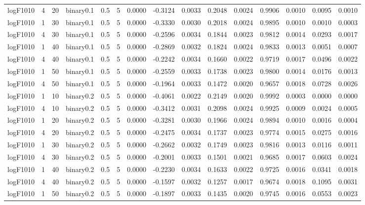 \begin{longtable}{rrrrrrrrrrrrrrr}
  logF1010 & 4 & 20 & binary0.1 & 0.5 & 5 & 0.0000 & -0.3124 & 0.0033 & 0.2048 & 0.0024 & 0.9906 & 0.0010 & 0.0095 & 0.0010 \\ 
  logF1010 & 1 & 30 & binary0.1 & 0.5 & 5 & 0.0000 & -0.3330 & 0.0030 & 0.2018 & 0.0024 & 0.9895 & 0.0010 & 0.0010 & 0.0003 \\ 
  logF1010 & 4 & 30 & binary0.1 & 0.5 & 5 & 0.0000 & -0.2596 & 0.0034 & 0.1844 & 0.0023 & 0.9812 & 0.0014 & 0.0293 & 0.0017 \\ 
  logF1010 & 1 & 40 & binary0.1 & 0.5 & 5 & 0.0000 & -0.2869 & 0.0032 & 0.1824 & 0.0024 & 0.9833 & 0.0013 & 0.0051 & 0.0007 \\ 
  logF1010 & 4 & 40 & binary0.1 & 0.5 & 5 & 0.0000 & -0.2242 & 0.0034 & 0.1660 & 0.0022 & 0.9719 & 0.0017 & 0.0496 & 0.0022 \\ 
  logF1010 & 1 & 50 & binary0.1 & 0.5 & 5 & 0.0000 & -0.2559 & 0.0033 & 0.1738 & 0.0023 & 0.9800 & 0.0014 & 0.0176 & 0.0013 \\ 
  logF1010 & 4 & 50 & binary0.1 & 0.5 & 5 & 0.0000 & -0.1964 & 0.0033 & 0.1472 & 0.0020 & 0.9657 & 0.0018 & 0.0728 & 0.0026 \\ 
  logF1010 & 1 & 10 & binary0.2 & 0.5 & 5 & 0.0000 & -0.4061 & 0.0022 & 0.2149 & 0.0020 & 0.9992 & 0.0003 & 0.0000 & 0.0000 \\ 
  logF1010 & 4 & 10 & binary0.2 & 0.5 & 5 & 0.0000 & -0.3412 & 0.0031 & 0.2098 & 0.0024 & 0.9925 & 0.0009 & 0.0024 & 0.0005 \\ 
  logF1010 & 1 & 20 & binary0.2 & 0.5 & 5 & 0.0000 & -0.3281 & 0.0030 & 0.1966 & 0.0024 & 0.9894 & 0.0010 & 0.0016 & 0.0004 \\ 
  logF1010 & 4 & 20 & binary0.2 & 0.5 & 5 & 0.0000 & -0.2475 & 0.0034 & 0.1737 & 0.0023 & 0.9774 & 0.0015 & 0.0275 & 0.0016 \\ 
  logF1010 & 1 & 30 & binary0.2 & 0.5 & 5 & 0.0000 & -0.2662 & 0.0032 & 0.1749 & 0.0023 & 0.9816 & 0.0013 & 0.0116 & 0.0011 \\ 
  logF1010 & 4 & 30 & binary0.2 & 0.5 & 5 & 0.0000 & -0.2001 & 0.0033 & 0.1501 & 0.0021 & 0.9685 & 0.0017 & 0.0603 & 0.0024 \\ 
  logF1010 & 1 & 40 & binary0.2 & 0.5 & 5 & 0.0000 & -0.2230 & 0.0034 & 0.1633 & 0.0022 & 0.9725 & 0.0016 & 0.0341 & 0.0018 \\ 
  logF1010 & 4 & 40 & binary0.2 & 0.5 & 5 & 0.0000 & -0.1597 & 0.0032 & 0.1257 & 0.0017 & 0.9674 & 0.0018 & 0.1095 & 0.0031 \\ 
  logF1010 & 1 & 50 & binary0.2 & 0.5 & 5 & 0.0000 & -0.1897 & 0.0033 & 0.1435 & 0.0020 & 0.9745 & 0.0016 & 0.0553 & 0.0023 \\ 

\end{longtable}
